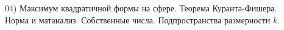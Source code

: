 04) Максимум квадратичной формы на сфере. Теорема Куранта-Фишера.\\
Норма и матанализ. Собственные числа. Подпространства размерности $k$.\\
